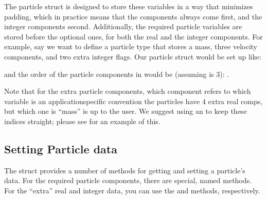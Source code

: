 \documentclass[letterpaper,10pt,english]{sphinxmanual}
\begin{document}
\sphinxAtStartPar
The particle struct is designed to store these variables in a way that
minimizes padding, which in practice means that the  components
always come first, and the integer components second. Additionally, the
required particle variables are stored before the optional ones, for both the
real and the integer components. For example, say we want to define a particle
type that stores a mass, three velocity components, and two extra integer
flags. Our particle struct would be set up like:

\begin{sphinxVerbatim}[commandchars=\\\{\}]
  
\end{sphinxVerbatim}

\sphinxAtStartPar
and the order of the particle components in would be (assuming  is 3):
.  \sphinxstepexplicit %
\begin{footnote}[3]\label{\thesphinxscope.3}%
\sphinxAtStartFootnote
Note that for the extra particle components, which component refers to which
variable is an application\sphinxhyphen{}specific convention \sphinxhyphen{} the particles have 4 extra real comps, but which one is “mass” is up
to the user. We suggest using an  to keep these indices straight; please
see  for an example of this.
%
\end{footnote}


\subsection{Setting Particle data}
\label{\detokenize{Particle:setting-particle-data}}
\sphinxAtStartPar
The  struct provides a number of methods for getting and setting
a particle’s data. For the required particle components, there are special,
named methods. For the “extra” real and integer data, you can use the
 and  methods, respectively.
\end{document}
